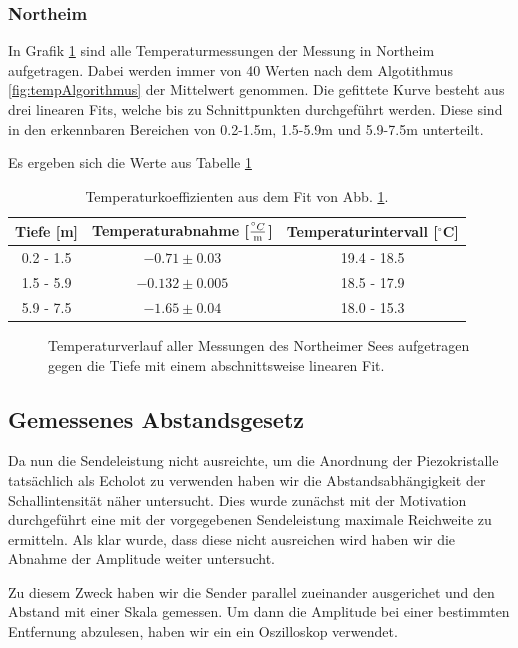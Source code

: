 \documentclass[12pt,a4paper,titlepage,headinclude,bibtotoc]{scrartcl}
\begin{document}
\subsubsection{Northeim}
In Grafik \ref{fig:temp_nor} sind alle Temperaturmessungen der Messung in Northeim aufgetragen.
Dabei werden immer von 40 Werten nach dem Algotithmus \eqref{fig:tempAlgorithmus} der Mittelwert genommen.
Die gefittete Kurve besteht aus drei linearen Fits, welche bis zu Schnittpunkten durchgeführt werden.
Diese sind in den erkennbaren Bereichen von 0.2-1.5m, 1.5-5.9m und 5.9-7.5m unterteilt.

Es ergeben sich die Werte aus Tabelle \ref{tab:tempTabNor}


\begin{table}
\centering
\begin{tabular}{|c||c|c|}
\hline
Tiefe [m] & Temperaturabnahme [$\frac{^\circ C}{\text m}$] & Temperaturintervall [$^\circ$C]\\\hline\hline
0.2 - 1.5 & $-0.71\pm  0.03$	& 19.4 - 18.5 \\
1.5 - 5.9 & $-0.132\pm 0.005$	& 18.5 - 17.9 \\
5.9 - 7.5 & $-1.65\pm 0.04$	& 18.0 - 15.3 \\\hline
\end{tabular}
\caption{Temperaturkoeffizienten aus dem Fit von Abb. \ref{fig:temp_nor}.}
\label{tab:tempTabNor}
\end{table}


\begin{figure}[h]
\centering

\caption{Temperaturverlauf aller Messungen des Northeimer Sees aufgetragen gegen die Tiefe mit einem abschnittsweise linearen Fit.}
\label{fig:temp_nor}
\end{figure}

\subsection{Gemessenes Abstandsgesetz}
Da nun die Sendeleistung nicht ausreichte, um die Anordnung der Piezokristalle tatsächlich als Echolot zu verwenden haben wir die Abstandsabhängigkeit der Schallintensität näher untersucht. 
Dies wurde zunächst mit der Motivation durchgeführt eine mit der vorgegebenen Sendeleistung maximale Reichweite zu ermitteln. Als klar wurde, dass diese nicht ausreichen wird haben wir
die Abnahme der Amplitude weiter untersucht.

Zu diesem Zweck haben wir die Sender parallel zueinander ausgerichet und den Abstand mit einer Skala gemessen. Um dann die Amplitude bei einer bestimmten Entfernung abzulesen, haben wir ein
ein Oszilloskop verwendet.
\end{document}
